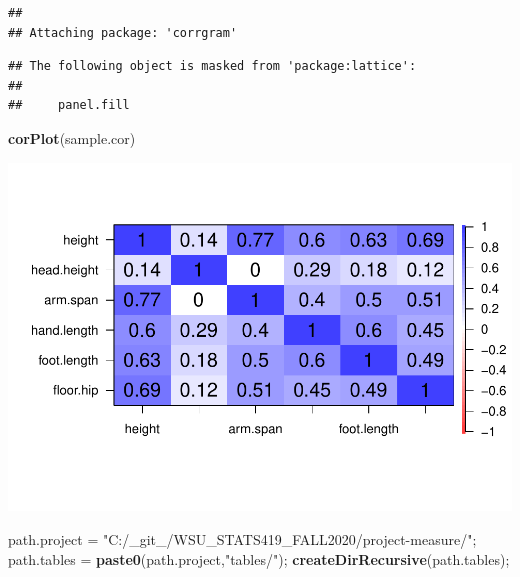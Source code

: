 \documentclass[]{article}
\newenvironment{Shaded}{\begin{snugshade}}{\end{snugshade}}
\newcommand{\KeywordTok}[1]{\textcolor[rgb]{0.13,0.29,0.53}{\textbf{#1}}}
\newcommand{\NormalTok}[1]{#1}
\newcommand{\StringTok}[1]{\textcolor[rgb]{0.31,0.60,0.02}{#1}}
\begin{document}
\begin{verbatim}
## 
## Attaching package: 'corrgram'
\end{verbatim}

\begin{verbatim}
## The following object is masked from 'package:lattice':
## 
##     panel.fill
\end{verbatim}

\begin{Shaded}
\begin{Highlighting}[]
\KeywordTok{corPlot}\NormalTok{(sample.cor)}
\end{Highlighting}
\end{Shaded}

\includegraphics{project-measure_files/figure-latex/corr-1.pdf}

\begin{Shaded}
\begin{Highlighting}[]
\NormalTok{path.project =}\StringTok{ "C:/\_git\_/WSU\_STATS419\_FALL2020/project{-}measure/"}\NormalTok{;}
\NormalTok{path.tables =}\StringTok{ }\KeywordTok{paste0}\NormalTok{(path.project,}\StringTok{"tables/"}\NormalTok{);}
  \KeywordTok{createDirRecursive}\NormalTok{(path.tables);}
\end{Highlighting}
\end{Shaded}
\end{document}
